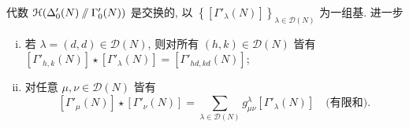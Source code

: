 \begin{theorem}\label{prop:Hall-Hecke-level}
	代数 $\EuScript{H}(\Delta'_0(N) \sslash \Gamma'_0(N))$ 是交换的, 以 $\left\{ \left[ \Gamma'_\lambda(N) \right] \right\}_{ \lambda \in \mathcal{D}(N)}$ 为一组基. 进一步
	\begin{enumerate}[(i)]
		\item 若 $\lambda = (d,d) \in \mathcal{D}(N)$, 则对所有 $(h, k) \in \mathcal{D}(N)$ 皆有 $[\Gamma'_{h,k}(N)] \star [\Gamma'_\lambda(N)] = [\Gamma'_{hd, kd}(N)]$;
		\item 对任意 $\mu, \nu \in \mathcal{D}(N)$ 皆有
		\[ [\Gamma'_\mu(N)] \star [\Gamma'_\nu(N)] = \sum_{\lambda \in \mathcal{D}(N)} g^\lambda_{\mu\nu} [\Gamma'_\lambda(N)] \quad \text{(有限和)}. \]
	\end{enumerate}
\end{theorem}
